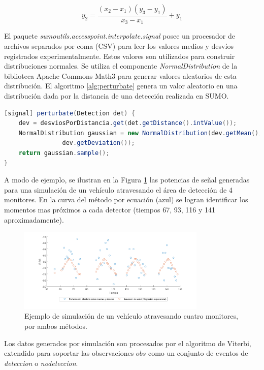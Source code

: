 \begin{equation}\label{eq:linear_interpolation}
y_2=\frac{(x_2-x_1)(y_3-y_1)}{x_3-x_1}+y_1
\end{equation}

El paquete \textit{sumoutils.accesspoint.interpolate.signal} posee un procesador de archivos separados por coma (CSV) para leer los valores medios y desvíos registrados experimentalmente. Estos valores son utilizados para construir distribuciones normales. Se utiliza el componente \textit{NormalDistribution} de la biblioteca Apache Commons Math3 para generar valores aleatorios de esta distribución. El algoritmo \ref{alg:perturbate} genera un valor aleatorio en una distribución dada por la distancia de una detección realizada en SUMO.

\clearpage

\begin{lstlisting}[language=Java, caption=Perturbación de detecciones Bluetooth, label=alg:perturbate]
[signal] perturbate(Detection det) {
	dev = desviosPorDistancia.get(det.getDistance().intValue());
	NormalDistribution gaussian = new NormalDistribution(dev.getMean(),
				dev.getDeviation());
	return gaussian.sample();
}
\end{lstlisting}

A modo de ejemplo, se ilustran en la Figura \ref{fig:eq-vs-means} las potencias de señal generadas para una simulación de un vehículo atravesando el área de detección de 4 monitores. En la curva del método por ecuación (azul) se logran identificar los momentos mas próximos a cada detector (tiempos 67, 93, 116 y 141 aproximadamente).

\begin{figure}[!htp]
	\centering
	\includegraphics[width=0.8\textwidth]{images/simu-eq-vs-means.png}
	\captionsetup{width=0.7\textwidth}
	\caption{Ejemplo de simulación de un vehículo atravesando cuatro monitores, por ambos métodos. }
    \label{fig:eq-vs-means}
\end{figure}

Los datos generados por simulación son procesados por el algoritmo de Viterbi, extendido para soportar las observaciones $obs$ como un conjunto de eventos de \textit{deteccion} o \textit{nodeteccion}.


